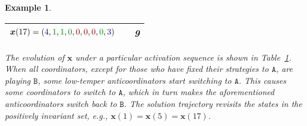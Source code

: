 \documentclass[10 pt,twocolumn,journal]{IEEEtran}
\theoremstyle{plain}
\newtheorem{example}{Example}[] %
\newcommand{\A}{\mathcal{A}}
\newcommand{\x}{\bm{x}}
\renewcommand{\A}{\mathtt{A}}
\newcommand{\B}{\mathtt{B}}
\theoremstyle{definition}
\begin{document}
\begin{example}
\begin{table}[ht]
\begin{center}
\begin{tabular}{|r|c|c|}
    \cellcolor{MyLightYellow}$\x(17)=({\color{Myblue}4}, {\color{Mygreen}1}, {\color{Mygreen}1}, {\color{Mygreen}0}, {\color{Myred}0}, {\color{Myred}0}, {\color{Myred}0}, {\color{Mygreen}0}, {\color{Myblue}3})$ & & 9\\ 
    \hline
	\end{tabular} \label{tab:state1}
   \end{center}
   \end{table}
   The evolution of $\x$ under a particular activation sequence is shown in Table~\ref{tab:state1}. 
     When all coordinators, except for those who have fixed their strategies to $\A$, are playing $\B$, some low-temper anticoordinators start switching to $\A$.
     This causes some coordinators to switch to $\A$, which in turn makes the aforementioned anticoordinators switch back to $\B$.
     The solution trajectory revisits the states in the positively invariant set, e.g., $\x(1)=\x(5)=\x(17)$.
\end{example}
	
\end{document}

